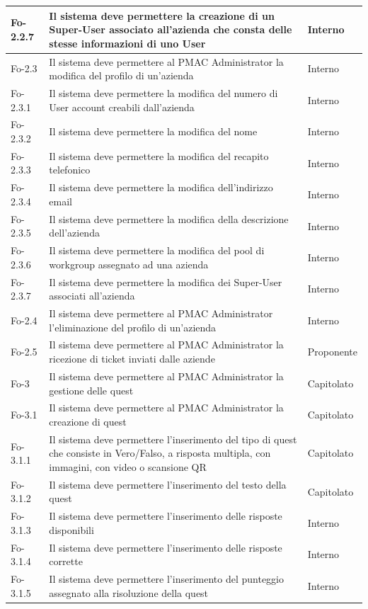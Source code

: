 {{\begin{longtable}{|p{}|p{}|p{}|}
\hline
Fo-2.2.7 & Il sistema deve permettere la creazione di un Super-User associato all'azienda che consta delle stesse informazioni di uno User & Interno\\
\hline
Fo-2.3 & Il sistema deve permettere al PMAC Administrator la modifica del profilo di un'azienda & Interno\\
\hline
Fo-2.3.1 & Il sistema deve permettere la modifica del numero di User account creabili dall'azienda & Interno\\
\hline
Fo-2.3.2 & Il sistema deve permettere la modifica del nome & Interno\\
\hline
Fo-2.3.3 & Il sistema deve permettere la modifica del recapito telefonico & Interno\\
\hline
Fo-2.3.4 & Il sistema deve permettere la modifica dell'indirizzo email & Interno\\
\hline
Fo-2.3.5 & Il sistema deve permettere la modifica della descrizione dell'azienda & Interno\\
\hline
Fo-2.3.6 & Il sistema deve permettere la modifica del pool di workgroup assegnato ad una azienda & Interno\\
\hline
Fo-2.3.7 & Il sistema deve permettere la modifica dei Super-User associati all'azienda & Interno\\
\hline
Fo-2.4 & Il sistema deve permettere al PMAC Administrator l'eliminazione del profilo di un'azienda & Interno\\
\hline
Fo-2.5 & Il sistema deve permettere al PMAC Administrator la ricezione di ticket inviati dalle aziende & Proponente\\
\hline
Fo-3 & Il sistema deve permettere al PMAC Administrator la gestione delle quest & Capitolato\\
\hline
Fo-3.1 & Il sistema deve permettere al PMAC Administrator la creazione di quest & Capitolato\\
\hline
Fo-3.1.1 & Il sistema deve permettere l'inserimento del tipo di quest che consiste in Vero/Falso, a risposta multipla, con immagini, con video o scansione QR & Capitolato\\
\hline
Fo-3.1.2 & Il sistema deve permettere l'inserimento del testo della quest & Capitolato\\
\hline
Fo-3.1.3 & Il sistema deve permettere l'inserimento delle risposte disponibili & Interno\\
\hline
Fo-3.1.4 & Il sistema deve permettere l'inserimento delle risposte corrette & Interno\\
\hline
Fo-3.1.5 & Il sistema deve permettere l'inserimento del punteggio assegnato alla risoluzione della quest & Interno\\

\end{longtable}}}
